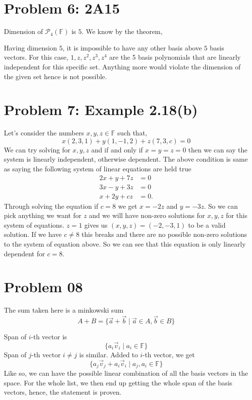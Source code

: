 \documentclass[letter]{article}
\begin{document}
\section*{Problem 6: 2A15} 
Dimension of $\mathcal{P}_4 (\mathbb{F})$ is $5$. We know by the theorem, 

Having dimension $5$, it is impossible to have any other basis above $5$ basis vectors. For this case, $1, z, z^2, z^3, z^{4}$ are the 5 basis polynomials that are linearly independent for this specific set. Anything more would violate the dimension of the given set hence is not possible. 

\section*{Problem 7: Example 2.18(b)}
Let's consider the numbers $x,y,z \in \mathbb{F}$ such that, 
\[
x(2,3,1) + y(1,-1,2) + z(7,3,c) = 0
\]
We can try solving for $x,y,z$ and if and only if $x=y=z=0$ then we can say the system is linearly independent, otherwise dependent. The above condition is same as saying the following system of linear equations are held true 
 \begin{align*}
	2x + y + 7 z &= 0 \\
	3x - y + 3 z &= 0 \\
	 x + 2y + cz &= 0 
.\end{align*}
Through solving the equation if $c = 8$ we get $x = -2 z$ and $y = -3 z$. So we can pick anything we want for $z$ and we will have non-zero solutions for $x,y,z$ for this system of equations. $z = 1$ gives us $(x,y,z) = (-2, -3, 1)$ to be a valid solution. If we have $c \neq 8$ this breaks and there are no possible non-zero solutions to the system of equation above. So we can see that this equation is only linearly dependent for $c = 8$.

\section*{Problem 08}
The sum taken here is a minkowski sum
\[
A + B = \{\vec{a}+\vec{b}  \mid  \vec{a} \in A, \vec{b} \in B\} 
\]

Span of $i$-th vector is 
\[
\{a_i \vec{v}_i  \mid a_i \in \mathbb{F}\} 
\]
Span of $j$-th vector $i\neq j$ is similar. Added to $i$-th vector, we get 
\[\{
a_j \vec{v}_j + a_i \vec{v}_i  \mid a_j, a_i \in \mathbb{F}\}
\]
Like so, we can have the possible linear combination of all the basis vectors in the space. For the whole list, we then end up getting the whole span of the basis vectors, hence, the statement is proven. 
\end{document}

